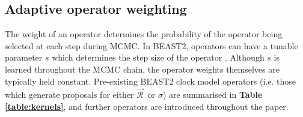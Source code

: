 \documentclass[10pt,letterpaper]{article}
\begin{document}
\clearpage
\subsection*{Adaptive operator weighting}
\label{sect:adaptiveSampling}


The weight of an operator determines the probability of the operator being selected at each step during MCMC.
In BEAST2, operators can have a tunable parameter $s$ which determines the step size of the operator \cite{bouckaert2019beast}. 
Although $s$ is learned throughout the MCMC chain, the operator weights themselves are typically held constant.
Pre-existing BEAST2 clock model operators (i.e. those which generate proposals for either $\vec{\mathcal{R}}^{\,}$ or $\sigma$) are summarised in \textbf{Table \ref{table:kernels}}, and further operators are introduced throughout the paper.





\end{document}
